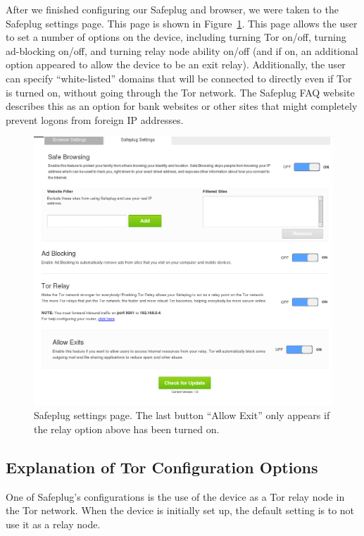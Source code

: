 \documentclass[conference]{IEEEtran}
\begin{document}

After we finished configuring our Safeplug and browser, we were taken to the Safeplug settings page.  This page is shown in Figure~\ref{fig:settings}.  This page allows the user to set a number of options on the device, including turning Tor on/off, turning ad-blocking on/off, and turning relay node ability on/off (and if on, an additional option appeared to allow the device to be an exit relay).  Additionally, the user can specify ``white-listed'' domains that will be connected to directly even if Tor is turned on, without going through the Tor network.  The Safeplug FAQ website describes this as an option for bank websites or other sites that might completely prevent logons from foreign IP addresses\cite{safeplug}.

\begin{figure}
  \centering
  \includegraphics[width=.65\textwidth]{settings_with_exit}
  \caption{Safeplug settings page.  The last button ``Allow Exit'' only appears if the relay option above has been turned on.}
  \label{fig:settings}
\end{figure}

\subsection{Explanation of Tor Configuration Options}
\label{port9001}
One of Safeplug's configurations is the use of the device as a Tor relay node in the Tor network.  When the device is initially set up, the default setting is to not use it as a relay node.  
\end{document}

